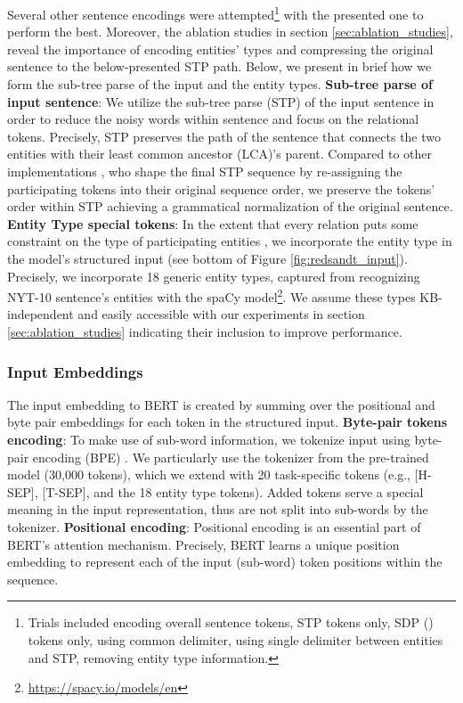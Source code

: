 \documentclass[11pt,a4paper]{article}
\begin{document}
Several other sentence encodings were attempted\footnote{Trials included encoding overall sentence tokens, STP tokens only, SDP (\cite{Xu2015}) tokens only, using common  delimiter, using single delimiter between entities and STP, removing entity type information.} with the presented one to perform the best. Moreover, the ablation studies in section \ref{sec:ablation_studies}, reveal the importance of encoding entities' types and compressing the original sentence to the below-presented STP path.
Below, we present in brief how we form the sub-tree parse of the input and the entity types. 
\newline
\textbf{Sub-tree parse of input sentence}:
We utilize the sub-tree parse (STP) of the input sentence in order to reduce the noisy words within sentence and focus on the relational tokens. Precisely, STP preserves the path of the sentence that connects the two entities with their least common ancestor (LCA)'s parent. Compared to other implementations \cite{Liu2018}, who shape the final STP sequence by re-assigning the participating tokens into their original sequence order, we preserve the tokens' order within STP achieving a grammatical normalization of the original sentence.
\newline
\textbf{Entity Type special tokens}:
In the extent that every relation puts some constraint on the type of participating entities \cite{Liu2014,Vashishth2018}, we incorporate the entity type in the model's structured input (see bottom of Figure \ref{fig:redsandt_input}). 
\newline
Precisely, we incorporate 18 generic entity types, captured from recognizing NYT-10 sentence’s entities with the spaCy model\footnote{\href{https://spacy.io/models/en}{https://spacy.io/models/en}}. We assume these types KB-independent and easily accessible with our experiments in section \ref{sec:ablation_studies} indicating their inclusion to improve performance.



\subsubsection{Input Embeddings}
The input embedding  to BERT is created by summing over the positional and byte pair embeddings for each token in the structured input. 
\newline
\textbf{Byte-pair tokens encoding}:
To make use of sub-word information, we tokenize input using byte-pair encoding (BPE) \cite{Sennrich2016}. We particularly use the tokenizer from the pre-trained model (30,000 tokens), which we extend with 20 task-specific tokens (e.g., [H-SEP], [T-SEP], and the 18 entity type tokens). Added tokens serve a special meaning in the input representation, thus are not split into sub-words by the tokenizer.
\newline
\textbf{Positional encoding}:
Positional encoding is an essential part of BERT's attention mechanism. Precisely, BERT learns a unique position embedding to represent each of the input (sub-word) token positions within the sequence.
\end{document}
